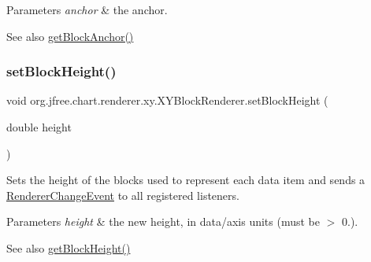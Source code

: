 \begin{DoxyParams}{Parameters}
{\em anchor} & the anchor.\\
\hline
\end{DoxyParams}
\begin{DoxySeeAlso}{See also}
\mbox{\hyperlink{classorg_1_1jfree_1_1chart_1_1renderer_1_1xy_1_1_x_y_block_renderer_a7f7b501fa081e927d3156cb126715b2a}{get\+Block\+Anchor()}} 
\end{DoxySeeAlso}
\mbox{\label{classorg_1_1jfree_1_1chart_1_1renderer_1_1xy_1_1_x_y_block_renderer_aae2bb132aaced9d2a933b9dd9b981a0c}} 
\subsubsection{\texorpdfstring{set\+Block\+Height()}{setBlockHeight()}}
{\footnotesize\ttfamily void org.\+jfree.\+chart.\+renderer.\+xy.\+X\+Y\+Block\+Renderer.\+set\+Block\+Height (\begin{DoxyParamCaption}\item[{double}]{height }\end{DoxyParamCaption})}

Sets the height of the blocks used to represent each data item and sends a \mbox{\hyperlink{}{Renderer\+Change\+Event}} to all registered listeners.


\begin{DoxyParams}{Parameters}
{\em height} & the new height, in data/axis units (must be $>$ 0.).\\
\hline
\end{DoxyParams}
\begin{DoxySeeAlso}{See also}
\mbox{\hyperlink{classorg_1_1jfree_1_1chart_1_1renderer_1_1xy_1_1_x_y_block_renderer_aac37f41e42556989584d8994e89833e6}{get\+Block\+Height()}} 
\end{DoxySeeAlso}
\mbox{\label{classorg_1_1jfree_1_1chart_1_1renderer_1_1xy_1_1_x_y_block_renderer_a83c689e43e5824dacae3ad92c8f376b1}} 

